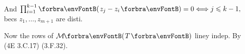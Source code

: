 \hfill And $\prod_{i=1}^{k-1}\Par{z_j-z_i}=0 \Longleftrightarrow j\leqslant k-1,$ becs $z_1,\dots,z_{m+1}$ are disti.\Blind{\quad}\vspace{34pt}\par\quad
\hfill Now the rows of $\Mt{T}$ liney indep. By (4E 3.C.17) \OR (3.F.32).\Blind{\quad}\PfEnd\vspace{6pt}
\SepLine


%



